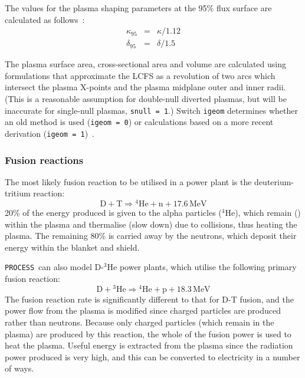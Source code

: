 \documentclass[11pt,a4paper]{report}
\newcommand{\process}{\mbox{\texttt{PROCESS}}}
\begin{document}
The values for the plasma shaping parameters at the 95\% flux surface are
calculated as follows~\cite{DEMOPhysicsGuidelines}:
\begin{eqnarray}
\kappa_{95} & = & \kappa / 1.12 \\
\delta_{95} & = & \delta / 1.5
\end{eqnarray}

The plasma surface area, cross-sectional area and volume are calculated using
formulations that approximate the LCFS as a revolution of two arcs which
intersect the plasma X-points and the plasma midplane outer and inner
radii. (This is a reasonable assumption for double-null diverted plasmas, but
will be inaccurate for single-null plasmas, \texttt{snull = 1}.) Switch
\texttt{igeom} determines whether an old method is used (\texttt{igeom = 0})
or calculations based on a more recent derivation (\texttt{igeom =
  1})~\cite{logbook14_41}.

\subsubsection{Fusion reactions}
\label{sec:fusion_reactions}

The most likely fusion reaction to be utilised in a power plant is the
deuterium-tritium reaction:
\begin{equation}
\mathrm{D + T} \Longrightarrow \mathrm{^{4}He + n + 17.6 \,MeV}
\label{eqn:d-t}
\end{equation}
20\% of the energy produced is given to the alpha particles ($^4$He), which
remain () within the plasma and thermalise (slow down)
due to collisions, thus heating the plasma. The remaining 80\% is carried away
by the neutrons, which deposit their energy within the blanket and shield.

\process\ can also model D-$^3$He power plants, which utilise the following primary
fusion reaction:
\begin{equation}
\mathrm{D + \mbox{$^3$He}} \Longrightarrow \mathrm{^{4}He + p + 18.3 \,MeV}
\label{eqn:dhe3}
\end{equation}
The fusion reaction rate is significantly different to that for D-T fusion,
and the power flow from the plasma is modified since charged particles are
produced rather than neutrons. Because only charged particles (which remain in
the plasma) are produced by this reaction, the whole of the fusion power is
used to heat the plasma. Useful energy is extracted from the plasma since the
radiation power produced is very high, and this can be converted to
electricity in a number of ways.
\end{document}
